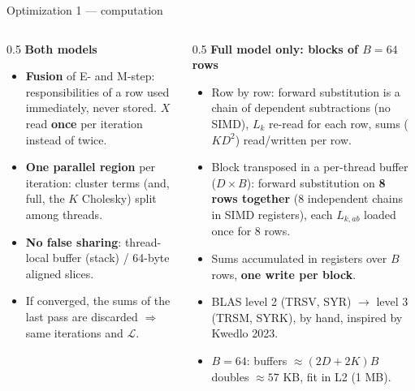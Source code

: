 \documentclass[aspectratio=169,10pt]{beamer}
\begin{document}
\begin{frame}{Optimization 1 --- computation}
\begin{columns}[T]
\begin{column}{0.5\textwidth}
\footnotesize
\textbf{Both models}
\begin{itemize}
\item \textbf{Fusion} of E- and M-step: responsibilities of a row used immediately, never stored. $X$ read \textbf{once} per iteration instead of twice.
\item \textbf{One parallel region} per iteration: cluster terms (and, full, the $K$ Cholesky) split among threads.
\item \textbf{No false sharing}: thread-local buffer (stack) / 64-byte aligned slices.
\item If converged, the sums of the last pass are discarded $\Rightarrow$ same iterations and $\mathcal{L}$.
\end{itemize}
\end{column}
\begin{column}{0.5\textwidth}
\footnotesize
\textbf{Full model only: blocks of $B=64$ rows}
\begin{itemize}
\item Row by row: forward substitution is a chain of dependent subtractions (no SIMD), $L_k$ re-read for each row, sums ($KD^2$) read/written per row.
\item Block transposed in a per-thread buffer ($D\times B$): forward substitution on \textbf{8 rows together} (8 independent chains in SIMD registers), each $L_{k,ab}$ loaded once for 8 rows.
\item Sums accumulated in registers over $B$ rows, \textbf{one write per block}.
\item BLAS level 2 (TRSV, SYR) $\to$ level 3 (TRSM, SYRK), by hand, inspired by Kwedlo 2023.
\item $B=64$: buffers $\approx(2D+2K)B$ doubles $\approx57$ KB, fit in L2 (1 MB).
\end{itemize}
\end{column}
\end{columns}
\end{frame}
\end{document}
